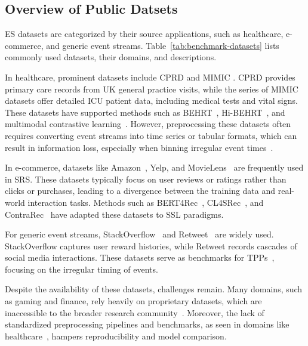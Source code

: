 \documentclass[twoside,11pt]{article}
\begin{document}
\subsection{Overview of Public Datsets}
ES datasets are categorized by their source applications, such as healthcare, e-commerce, and generic event streams. Table~\ref{tab:benchmark-datasets} lists commonly used datasets, their domains, and descriptions.

In healthcare, prominent datasets include CPRD  and MIMIC . CPRD provides primary care records from UK general practice visits, while the series of MIMIC datasets offer detailed ICU patient data, including medical tests and vital signs. These datasets have supported methods such as BEHRT~, Hi-BEHRT~, and multimodal contrastive learning~. However, preprocessing these datasets often requires converting event streams into time series or tabular formats, which can result in information loss, especially when binning irregular event times~.

In e-commerce, datasets like Amazon~, Yelp, and MovieLens~ are frequently used in SRS. These datasets typically focus on user reviews or ratings rather than clicks or purchases, leading to a divergence between the training data and real-world interaction tasks. Methods such as BERT4Rec~, CL4SRec~, and ContraRec~ have adapted these datasets to SSL paradigms.

For generic event streams, StackOverflow~ and Retweet~ are widely used. StackOverflow captures user reward histories, while Retweet records cascades of social media interactions. These datasets serve as benchmarks for TPPs~, focusing on the irregular timing of events.

Despite the availability of these datasets, challenges remain. Many domains, such as gaming and finance, rely heavily on proprietary datasets, which are inaccessible to the broader research community~. Moreover, the lack of standardized preprocessing pipelines and benchmarks, as seen in domains like healthcare~, hampers reproducibility and model comparison.
\end{document}
